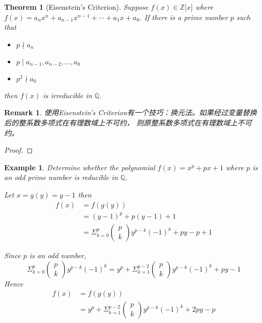 \documentclass[onecolumn]{ctexart}
\newtheorem{theorem}{Theorem}
\newtheorem{remark}{Remark}
\newtheorem{example}{Example}
\begin{document}
\begin{theorem}[Eisenstein's Criterion]
  Suppose $f(x) \in \mathbb{Z}\lbrack x \rbrack$ where $f(x) = a_n x^n + 
  a_{n-1} x^{n-1} + \cdots + a_1 x + a_0$. If there is a prime number $p$ such that
  \begin{itemize}
    \item $p \nmid a_n$
    \item $p \mid a_{n-1}, a_{n-2}, \ldots, a_0$
    \item $p^2 \nmid a_0$
  \end{itemize}
  then $f(x)$ is irreducible in $\mathbb{Q}$.
\end{theorem}

\begin{remark}
  使用Eisenstein's Criterion有一个技巧：换元法。如果经过变量替换后的整系数多项式在有理数域上不可约，
  则原整系数多项式在有理数域上不可约。
\end{remark}
\begin{proof}
  
\end{proof}

\begin{example}
  Determine whether the polynomial $f(x) = x^p + px + 1$ where $p$ is an odd 
  prime number is reducible in $\mathbb{Q}$.

  Let $x = g(y) = y - 1$ then 
  \[
    \begin{split}
      f(x) &= f(g(y)) \\
           &= (y - 1)^p + p(y - 1) + 1 \\
           &= \Sigma_{k=0}^p 
              \begin{pmatrix}
                p \\
                k
              \end{pmatrix} y^{p-k}(-1)^k + py - p + 1
    \end{split}
  \]

  Since $p$ is an odd number, 
  \[
    \Sigma_{k=0}^p 
    \begin{pmatrix}
      p \\
      k
    \end{pmatrix} y^{p-k}(-1)^k = y^p + \Sigma_{k=1}^{p-2} 
    \begin{pmatrix}
      p \\
      k
    \end{pmatrix} y^{p-k}(-1)^k + py - 1
  \]
  Hence
  \[
    \begin{split}
      f(x) &= f(g(y)) \\
           &= y^p + \Sigma_{k=1}^{p-2} 
              \begin{pmatrix}
                p \\
                k
              \end{pmatrix} y^{p-k}(-1)^k + 2py - p
    \end{split}
  \]
\end{example}
\end{document}

